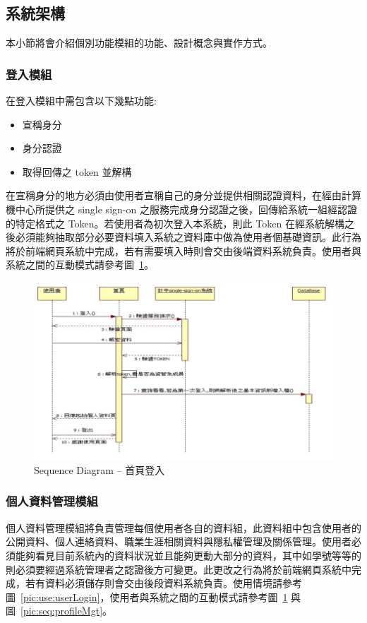 \subsection{系統架構}

本小節將會介紹個別功能模組的功能、設計概念與實作方式。

\subsubsection{登入模組}
在登入模組中需包含以下幾點功能: 
\begin{itemize}
\item{宣稱身分}
\item{身分認證}
\item{取得回傳之 token 並解構}
\end{itemize}
在宣稱身分的地方必須由使用者宣稱自己的身分並提供相關認證資料，在經由計算機中心所提供之 single sign-on 之服務完成身分認證之後，回傳給系統一組經認證的特定格式之 Token。若使用者為初次登入本系統，則此 Token 在經系統解構之後必須能夠抽取部分必要資料填入系統之資料庫中做為使用者個基礎資訊。此行為將於前端網頁系統中完成，若有需要填入時則會交由後端資料系統負責。使用者與系統之間的互動模式請參考圖~\ref{pic:seq:login}。

\begin{figure}[H]
\centering
\includegraphics[width=\textwidth]{img/seq01.png}
\caption{Sequence Diagram -- 首頁登入}
\label{pic:seq:login}
\end{figure}

\subsubsection{個人資料管理模組}
個人資料管理模組將負責管理每個使用者各自的資料組，此資料組中包含使用者的公開資料、個人連絡資料、職業生涯相關資料與隱私權管理及關係管理。使用者必須能夠看見目前系統內的資料狀況並且能夠更動大部分的資料，其中如學號等等的則必須要經過系統管理者之認證後方可變更。此更改之行為將於前端網頁系統中完成，若有資料必須儲存則會交由後段資料系統負責。使用情境請參考圖~\ref{pic:use:userLogin}，使用者與系統之間的互動模式請參考圖~\ref{pic:seq:login} 與圖~\ref{pic:seq:profileMgt}。

